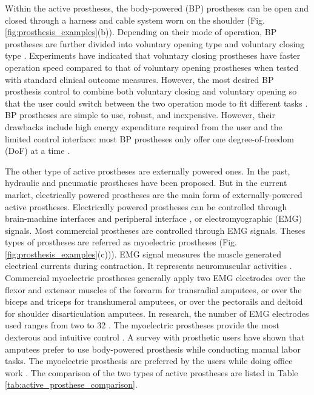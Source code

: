 Within the active prostheses, the body-powered (BP) prostheses can be open and closed through a harness and cable system worn on the shoulder (Fig. \ref{fig:prosthesis_examples}(b)). Depending on their mode of operation, BP prostheses are further divided into voluntary opening type and voluntary closing type \cite{noauthor_6a:_nodate}. Experiments have indicated that voluntary closing prostheses have faster operation speed compared to that of voluntary opening prostheses when tested with standard clinical outcome measures. However, the most desired BP prosthesis control to combine both voluntary closing and voluntary opening so that the user could switch between the two operation mode to fit different tasks \cite{berning2014comparison}. 
BP prostheses are simple to use, robust, and inexpensive. However, their drawbacks include high energy expenditure required from the user and the limited control interface: most BP prostheses only offer one degree-of-freedom  (DoF) at a time \cite{hosmer}. 

The other type of active prostheses are externally powered ones. In the past, hydraulic and pneumatic prostheses have been proposed. But in the current market, electrically powered prostheses are the main form of externally-powered active prostheses. Electrically powered prostheses can be controlled through brain-machine interfaces \cite{noauthor_revolutionizing_nodate, guger1999prosthetic, aggarwal2006noninvasive} and peripheral interface \cite{ortiz2014osseointegrated,raspopovic2014restoring,dhillon2005direct,di2012human,oddo2016intraneural,horch2011object}, or electromyographic (EMG) signals. Most commercial prostheses are controlled through EMG signals. Theses types of prostheses are referred as myoelectric prostheses (Fig. \ref{fig:prosthesis_examples}(c))). EMG signal measures the muscle generated electrical currents during contraction. It represents neuromuscular activities \cite{reaz2006techniques}. Commercial myoelectric prostheses generally apply two EMG electrodes over the flexor and extensor muscles of the forearm for transradial amputees, or over the biceps and triceps for transhumeral amputees, or over the pectorails and deltoid for shoulder disarticulation amputees. In research, the number of EMG electrodes used ranges from two to 32 \cite{ottobock_sensor_hand_speed, tenore2007towards}. 
The myoelectric prostheses provide the most dexterous and intuitive control \cite{cordella2016literature}. A survey with prosthetic users have shown that amputees prefer to use body-powered prosthesis while conducting manual labor tasks. The myoelectric prosthesis are preferred by the users while doing office work \cite{carey2015differences}. The comparison of the two types of active prostheses are listed in Table \ref{tab:active_prosthese_comparison}.



